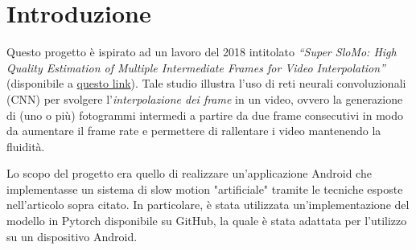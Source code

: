 \chapter*{Introduzione}

Questo progetto è ispirato ad un lavoro del 2018 intitolato 
\textit{``Super SloMo: High Quality Estimation of Multiple Intermediate Frames for Video Interpolation''}
(disponibile a \href{http://jianghz.me/projects/superslomo/}{questo link}).
Tale studio illustra l'uso di reti neurali convoluzionali (CNN) per svolgere l'\textit{interpolazione dei frame} in un video, ovvero la generazione
di (uno o più) fotogrammi intermedi a partire da due frame consecutivi in modo da aumentare il frame rate e permettere di rallentare i video mantenendo la fluidità.

Lo scopo del progetto era quello di realizzare un'applicazione Android
che implementasse un sistema di slow motion "artificiale" tramite le tecniche esposte nell'articolo sopra citato.
In particolare, è stata utilizzata un'implementazione del modello in Pytorch disponibile su GitHub, la quale è stata adattata per l'utilizzo su un dispositivo Android.